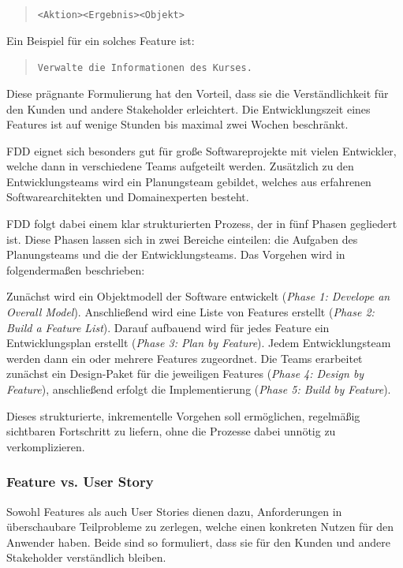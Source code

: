 \documentclass[acmtog]{acmart}
\begin{document}
\begin{quote}
	\texttt{<Aktion>\hspace{5ex}<Ergebnis>\hspace{5ex}<Objekt>}
\end{quote}

Ein Beispiel für ein solches Feature ist:

\begin{quote}
	\texttt{Verwalte die Informationen des Kurses.}
\end{quote}

Diese prägnante Formulierung hat den Vorteil, dass sie die Verständlichkeit für den Kunden und andere Stakeholder erleichtert.
Die Entwicklungszeit eines Features ist auf wenige Stunden bis maximal zwei Wochen beschränkt.

FDD eignet sich besonders gut für große Softwareprojekte mit vielen Entwickler, welche dann in verschiedene Teams aufgeteilt werden.
Zusätzlich zu den Entwicklungsteams wird ein Planungsteam gebildet, welches aus erfahrenen Softwarearchitekten und Domainexperten besteht.

FDD folgt dabei einem klar strukturierten Prozess, der in fünf Phasen gegliedert ist. Diese Phasen lassen sich in zwei Bereiche einteilen: die Aufgaben des Planungsteams und die der Entwicklungsteams. Das Vorgehen wird in \cite{coad99} folgendermaßen beschrieben:

Zunächst wird ein Objektmodell der Software entwickelt (\emph{Phase 1: Develope an Overall Model}).
Anschließend wird eine Liste von Features erstellt (\emph{Phase 2: Build a Feature List}).
Darauf aufbauend wird für jedes Feature ein Entwicklungsplan erstellt (\emph{Phase 3: Plan by Feature}).
Jedem Entwicklungsteam werden dann ein oder mehrere Features zugeordnet.
Die Teams erarbeitet zunächst ein Design-Paket für die jeweiligen Features (\emph{Phase 4: Design by Feature}),
anschließend erfolgt die Implementierung (\emph{Phase 5: Build by Feature}).

Dieses strukturierte, inkrementelle Vorgehen soll ermöglichen, regelmäßig sichtbaren Fortschritt zu liefern, ohne die Prozesse dabei unnötig zu verkomplizieren.


\subsubsection{Feature vs. User Story}

Sowohl Features als auch User Stories dienen dazu, Anforderungen in überschaubare Teilprobleme zu zerlegen, welche einen konkreten Nutzen für den Anwender haben. Beide sind so formuliert, dass sie für den Kunden und andere Stakeholder verständlich bleiben.
\end{document}
